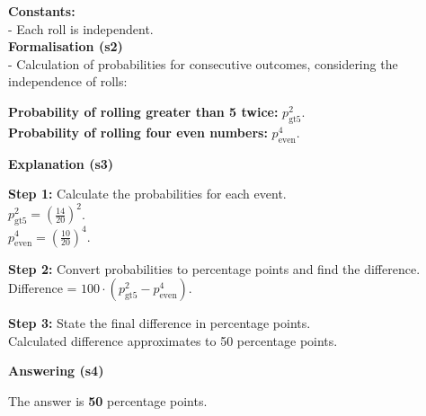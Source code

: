 \documentclass[11pt]{article}
\begin{document}
\begin{table*}[]
\begin{small}
\begin{tcolorbox}[colback=white, colframe=lightblue, rounded corners]
\textbf{Constants:}\\

\hspace*{0.5cm} - Each roll is independent.\\

\textbf{Formalisation (s2)}\\

- Calculation of probabilities for consecutive outcomes, considering the independence of rolls:

\hspace*{0.5cm} \textbf{Probability of rolling greater than 5 twice:} \( p_{\text{gt5}}^2 \).\\
\hspace*{0.5cm} \textbf{Probability of rolling four even numbers:} \( p_{\text{even}}^4 \).

\textbf{Explanation (s3)}

\textbf{Step 1:} Calculate the probabilities for each event.\\
\hspace*{1cm} \( p_{\text{gt5}}^2 = \left(\frac{14}{20}\right)^2 \).\\
\hspace*{1cm} \( p_{\text{even}}^4 = \left(\frac{10}{20}\right)^4 \).

\textbf{Step 2:} Convert probabilities to percentage points and find the difference.\\
\hspace*{1cm} Difference = \( 100 \cdot (p_{\text{gt5}}^2 - p_{\text{even}}^4) \).

\textbf{Step 3:} State the final difference in percentage points.\\
\hspace*{1cm} Calculated difference approximates to 50 percentage points.

\textbf{Answering (s4)}

The answer is \textcolor{citecolor!80}{\textbf{50}} percentage points.

\end{tcolorbox} 
\end{small}
\label{tab:example_Dice_Probabilities}
\end{table*}
\end{document}
